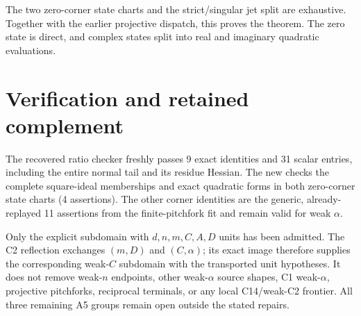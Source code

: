 The two zero-corner state charts and the strict/singular jet split
are exhaustive. Together with the earlier projective dispatch, this
proves the theorem. The zero state is direct, and complex states split
into real and imaginary quadratic evaluations.

\section*{Verification and retained complement}

The recovered ratio checker freshly passes 9 exact identities and
31 scalar entries, including the entire normal tail and its residue
Hessian. The new  checks the
complete square-ideal memberships and exact quadratic forms in both
zero-corner state charts (4 assertions). The other corner identities
are the generic, already-replayed 11 assertions from the finite-pitchfork
fit and remain valid for weak $\alpha$.

Only the explicit subdomain with $d,n,m,C,A,D$ units has been admitted.
The C2 reflection exchanges $(m,D)$ and $(C,\alpha)$; its exact image
therefore supplies the corresponding weak-$C$ subdomain with the
transported unit hypotheses. It does not remove weak-$n$ endpoints,
other weak-$\alpha$ source shapes, C1 weak-$\alpha$, projective
pitchforks, reciprocal terminals, or any local C14/weak-C2 frontier.
All three remaining A5 groups remain open outside the stated repairs.
